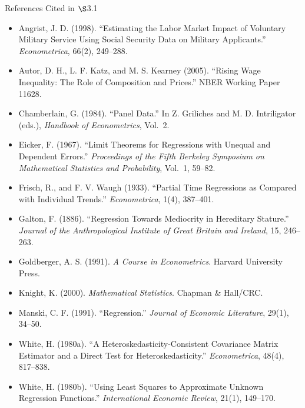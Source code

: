 \documentclass[aspectratio=169,11pt]{beamer}
\newcommand{\Sec}{\ensuremath{\S}}
\begin{document}
\begin{frame}{References Cited in \Sec{}3.1}
\scriptsize

\begin{itemize}
    \item Angrist, J. D. (1998). ``Estimating the Labor Market Impact of
    Voluntary Military Service Using Social Security Data on Military
    Applicants.'' \emph{Econometrica}, 66(2), 249--288.
    \item Autor, D. H., L. F. Katz, and M. S. Kearney (2005). ``Rising Wage
    Inequality: The Role of Composition and Prices.'' NBER Working Paper
    11628.
    \item Chamberlain, G. (1984). ``Panel Data.'' In Z. Griliches and
    M. D. Intriligator (eds.), \emph{Handbook of Econometrics}, Vol.~2.
    \item Eicker, F. (1967). ``Limit Theorems for Regressions with Unequal and
    Dependent Errors.'' \emph{Proceedings of the Fifth Berkeley Symposium on
    Mathematical Statistics and Probability}, Vol.~1, 59--82.
    \item Frisch, R., and F. V. Waugh (1933). ``Partial Time Regressions as
    Compared with Individual Trends.'' \emph{Econometrica}, 1(4), 387--401.
    \item Galton, F. (1886). ``Regression Towards Mediocrity in Hereditary
    Stature.'' \emph{Journal of the Anthropological Institute of Great
    Britain and Ireland}, 15, 246--263.
    \item Goldberger, A. S. (1991). \emph{A Course in Econometrics}. Harvard
    University Press.
    \item Knight, K. (2000). \emph{Mathematical Statistics}. Chapman \&
    Hall/CRC.
    \item Manski, C. F. (1991). ``Regression.'' \emph{Journal of Economic
    Literature}, 29(1), 34--50.
    \item White, H. (1980a). ``A Heteroskedasticity-Consistent Covariance
    Matrix Estimator and a Direct Test for Heteroskedasticity.''
    \emph{Econometrica}, 48(4), 817--838.
    \item White, H. (1980b). ``Using Least Squares to Approximate Unknown
    Regression Functions.'' \emph{International Economic Review}, 21(1),
    149--170.
\end{itemize}

\end{frame}
\end{document}
